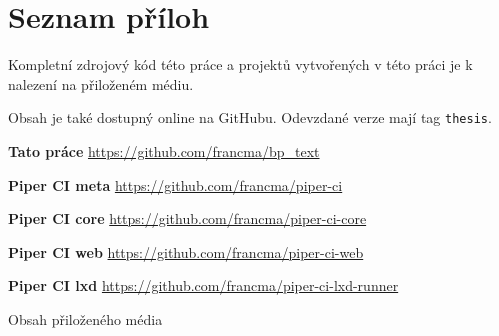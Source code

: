 
\chapter{Seznam příloh}

Kompletní zdrojový kód této práce a projektů vytvořených v této práci je k nalezení na přiloženém médiu.

Obsah je také dostupný online na GitHubu. 
Odevzdané verze mají tag \texttt{thesis}.

\noindent \textbf{Tato práce} \hfill
\url{https://github.com/francma/bp_text}

\noindent \textbf{Piper CI meta} \hfill
\url{https://github.com/francma/piper-ci}

\noindent \textbf{Piper CI core} \hfill
\url{https://github.com/francma/piper-ci-core}
    
\noindent \textbf{Piper CI web} \hfill
\url{https://github.com/francma/piper-ci-web}

\noindent \textbf{Piper CI lxd} \hfill
\url{https://github.com/francma/piper-ci-lxd-runner}

\vfill

\begin{dirfigure}%
\caption{Obsah přiloženého média}
\end{dirfigure}